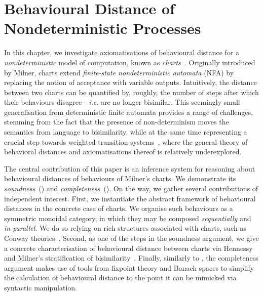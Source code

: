 \chapter{Behavioural Distance of Nondeterministic Processes}
\label{chapter3}

In this chapter, we investigate axiomatisations of behavioural distance for a {\em nondeterministic} model of computation, known as \emph{charts}~\cite{Milner:1984:Complete}. Originally introduced by Milner, charts extend \emph{finite-state nondeterministic automata} (NFA) by replacing the notion of acceptance with variable outputs. Intuitively, the distance between two charts can be quantified by, roughly, the number of steps after which their behaviours disagree---\emph{i.e.} are no longer bisimilar. This seemingly small generalisation from deterministic finite automata provides a range of challenges, stemming from the fact that the presence of non-determinism moves the semantics from language to bisimilarity, while at the same time representing a crucial step towards weighted transition systems~\cite{Larsen:2011:Metrics}, where the general theory of behavioral distances and axiomatisations thereof is relatively underexplored. 


The central contribution of this paper is an inference system for reasoning about behavioural distances of behaviours of Milner's charts. We demonstrate its \emph{soundness}~() and \emph{completeness}~(). On the way, we gather several contributions of independent interest. First, we instantiate the abstract framework of behavioural distances in the concrete case of charts. We organise such behaviours as a symmetric monoidal category, in which they may be composed \emph{sequentially} and \emph{in parallel}. We do so relying on rich structures associated with charts, such as Conway theories~\cite{Bloom:1993:Iteration,Esik:1999:Group}. Second, as one of the steps in the soundness argument, we give a concrete characterisation of behavioural distance between charts via Hennessy and Milner's stratification of bisimilarity~\cite{hennessy:1985:algebraic}. Finally, similarly to , the completeness argument makes use of tools from fixpoint theory and Banach spaces to simplify the calculation of behavioural distance to the point it can be mimicked via syntactic manipulation.

